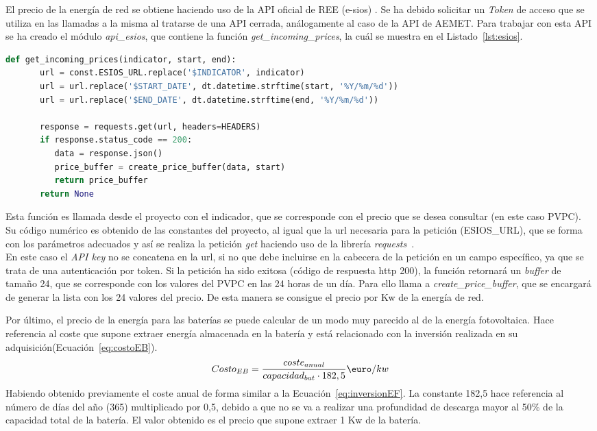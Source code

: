 	El precio de la energía de red se obtiene haciendo uso de la \gls{API} oficial de \gls{REE} (e-sios) \cite{Ree}. Se ha debido solicitar un \textit{Token} de acceso que se utiliza en las llamadas a la misma al tratarse de una \gls{API} cerrada, análogamente al caso de la \gls{API} de AEMET. Para trabajar con esta \gls{API} se ha creado el módulo \textit{api\_esios}, que contiene la función \textit{get\_incoming\_prices}, la cuál se muestra en el Listado~\ref{lst:esios}.

	\begin{lstlisting}[language=Python,float=ht,caption={Función para obtener el precio del mercado eléctrico},label={lst:esios}]
	def get_incoming_prices(indicator, start, end):
	   url = const.ESIOS_URL.replace('$INDICATOR', indicator)
	   url = url.replace('$START_DATE', dt.datetime.strftime(start, '%Y/%m/%d'))
	   url = url.replace('$END_DATE', dt.datetime.strftime(end, '%Y/%m/%d'))

	   response = requests.get(url, headers=HEADERS)
	   if response.status_code == 200:
	      data = response.json()
	      price_buffer = create_price_buffer(data, start)
	      return price_buffer
	   return None
	\end{lstlisting}

	Esta función es llamada desde el proyecto con el indicador, que se corresponde con el precio que se desea consultar (en este caso \gls{PVPC}). Su código numérico es obtenido de las constantes del proyecto, al igual que la url necesaria para la petición (ESIOS\_URL), que se forma con los parámetros adecuados y así se realiza la petición \textit{get} haciendo uso de la librería \textit{requests}~\cite{Kenn11}.\\En este caso el \textit{\gls{API} key} no se concatena en la url, si no que debe incluirse en la cabecera de la petición en un campo específico, ya que se trata de una autenticación por token. Si la petición ha sido exitosa (código de respuesta http 200), la función retornará un \textit{buffer} de tamaño 24, que se corresponde con los valores del \gls{PVPC} en las 24 horas de un día. Para ello llama a \textit{create\_price\_buffer}, que se encargará de generar la lista con los 24 valores del precio. De esta manera se consigue el precio por Kw de la energía de red.

	Por último, el precio de la energía para las baterías se puede calcular de un modo muy parecido al de la energía fotovoltaica. Hace referencia al coste que supone extraer energía almacenada en la batería y está relacionado con la inversión realizada en su adquisición(Ecuación~\ref{eq:costoEB}).
	\begin{equation}
          \label{eq:costoEB}
	Costo_{EB} = \frac{coste_{anual}}{capacidad_{bat}\cdot182,5} \textup{\euro}/kw
	\end{equation}
	Habiendo obtenido previamente el coste anual de forma similar a la Ecuación~\ref{eq:inversionEF}. La constante 182,5 hace referencia al número de días del año (365) multiplicado por 0,5, debido a que no se va a realizar una profundidad de descarga mayor al 50\% de la capacidad total de la batería. El valor obtenido es el precio que supone extraer 1 Kw de la batería.
